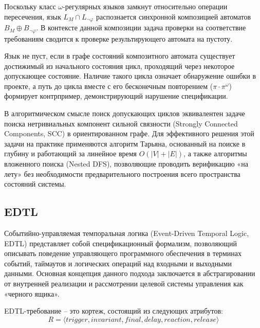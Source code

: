 Поскольку класс $\omega$-регулярных языков замкнут относительно операции пересечения, язык $L_M \cap L_{\neg\varphi}$ распознается синхронной композицией автоматов $B_M \oplus B_{\neg\varphi}$. В контексте данной композиции задача проверки на соответствие требованиям сводится к проверке результирующего автомата на пустоту.

Язык не пуст, если в графе состояний композитного автомата существует достижимый из начального состояния цикл, проходящий через некоторое допускающее состояние. Наличие такого цикла означает обнаружение ошибки в проекте, а путь до цикла вместе с его бесконечным повторением ($\pi \cdot \pi^\omega$) формирует контрпример, демонстрирующий нарушение спецификации. 

В алгоритмическом смысле поиск допускающих циклов эквивалентен задаче поиска нетривиальных компонент сильной связности (Strongly Connected Components, SCC) в ориентированном графе. Для эффективного решения этой задачи на практике применяются алгоритм Тарьяна, основанный на поиске в глубину и работающий за линейное время $O(|V| + |E|)$, а также алгоритмы вложенного поиска (Nested DFS), позволяющие проводить верификацию «на лету» без необходимости предварительного построения всего пространства состояний системы.
\subsection{EDTL}\label{sec:edtl}

Событийно-управляемая темпоральная логика (Event-Driven Temporal Logic, EDTL) представляет собой спецификационный формализм, позволяющий описывать поведение управляющего программного обеспечения в терминах событий, таймаутов и логических операций над входными и выходными данными. Основная концепция данного подхода заключается в абстрагировании от внутренней реализации и рассмотрении целевой системы управления как «черного ящика».

\begin{definition}\label{def:edtl-req}
  EDTL-требование -- это кортеж, состоящий из следующих атрибутов:
\begin{equation}
    R = \langle trigger, invariant, final, delay, reaction, release \rangle
\end{equation}
\end{definition}

